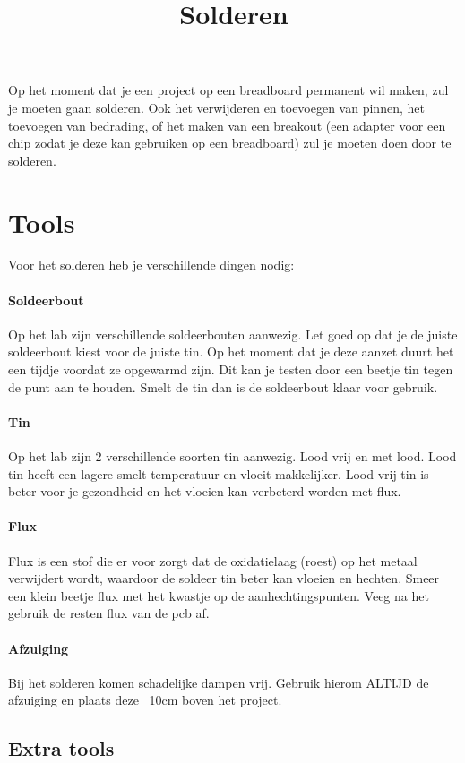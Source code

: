 \documentclass{guide}
\title{Solderen}
\begin{document}
Op het moment dat je een project op een breadboard permanent wil maken, zul je moeten gaan solderen. Ook het verwijderen en toevoegen van pinnen, het toevoegen van bedrading, of het maken van een breakout (een adapter voor een chip zodat je deze kan gebruiken op een breadboard) zul je moeten doen door te solderen.
\section{Tools}
Voor het solderen heb je verschillende dingen nodig:

\paragraph{Soldeerbout} Op het lab zijn verschillende soldeerbouten aanwezig. Let goed op dat je de juiste soldeerbout kiest voor de juiste tin. Op het moment dat je deze aanzet duurt het een tijdje voordat ze opgewarmd zijn. Dit kan je testen door een beetje tin tegen de punt aan te houden. Smelt de tin dan is de soldeerbout klaar voor gebruik.

\paragraph{Tin} Op het lab zijn 2 verschillende soorten tin aanwezig. Lood vrij en met lood. Lood tin heeft een lagere smelt temperatuur en vloeit makkelijker. Lood vrij tin is beter voor je gezondheid en het vloeien kan verbeterd worden met flux.

\paragraph{Flux} Flux is een stof die er voor zorgt dat de oxidatielaag (roest) op het metaal verwijdert wordt, waardoor de soldeer tin beter kan vloeien en hechten. Smeer een klein beetje flux met het kwastje op de aanhechtingspunten. Veeg na het gebruik de resten flux van de pcb af.

\paragraph{Afzuiging}
Bij het solderen komen schadelijke dampen vrij. Gebruik hierom ALTIJD de afzuiging en plaats deze ~10cm boven het project.
\subsection{Extra tools}
\end{document}
